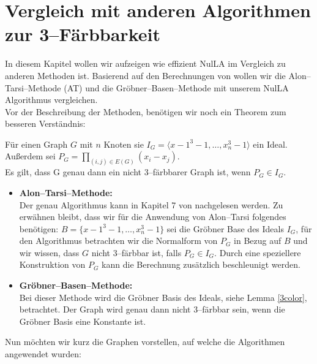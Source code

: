 \section{Vergleich mit anderen Algorithmen zur 3--Färbbarkeit} \label{vergleich}

In diesem Kapitel wollen wir aufzeigen wie effizient NulLA im Vergleich zu anderen Methoden ist. Basierend auf den Berechnungen von \cite{Loera2011} wollen wir die Alon--Tarsi--Methode (AT) und die Gröbner--Basen--Methode mit unserem NulLA Algorithmus vergleichen.\\

\noindent Vor der Beschreibung der Methoden, benötigen wir noch ein Theorem zum besseren Verständnis:

\begin{theorem}
Für einen Graph $G$ mit $n$ Knoten sie $I_G = \langle x-1^3-1,\ldots, x_n^3-1 \rangle$ ein Ideal. Außerdem sei $P_G = \prod_{(i,j) \in E(G)} (x_i-x_j)$.\\
Es gilt, dass G genau dann ein nicht 3--färbbarer Graph ist, wenn $P_G \in I_G$.
\end{theorem}

\begin{itemize}
\item \textbf{Alon--Tarsi--Methode: }\\
Der genau Algorithmus kann in Kapitel 7 von \cite{Alon1999} nachgelesen werden. Zu erwähnen bleibt, dass wir für die Anwendung von Alon--Tarsi folgendes  benötigen: $B = \{x-1^3-1,\ldots, x_n^3-1\}$ sei die Gröbner Base des Ideals $I_G$, für den Algorithmus betrachten wir die Normalform von $P_G$ in Bezug auf $B$ und wir wissen, dass $G$ nicht 3--färbbar ist, falls $P_G \in I_G$. Durch eine speziellere Konstruktion von $P_G$ kann die Berechnung zusätzlich beschleunigt werden.
\item \textbf{Gröbner--Basen--Methode: }\\
Bei dieser Methode wird die Gröbner Basis des Ideals, siehe Lemma \ref{3color}, betrachtet. Der Graph wird genau dann nicht 3--färbbar sein, wenn die Gröbner Basis eine Konstante ist.
\end{itemize}

Nun möchten wir kurz die Graphen vorstellen, auf welche die Algorithmen angewendet wurden:

